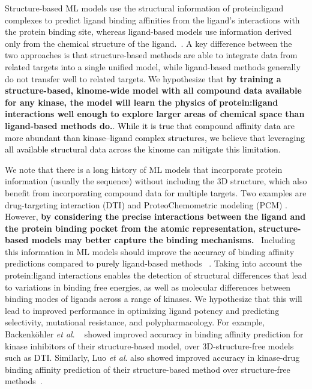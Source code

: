 \documentclass[9pt,lessons]{livecoms}
\newcommand{\revision}[1]{\textcolor{black}{#1}}
\begin{document}
Structure-based ML models use the structural information of protein:ligand complexes to predict ligand binding affinities from the ligand's interactions with the protein binding site, whereas ligand-based models use information derived only from the chemical structure of the ligand.~\cite{sliwoski2014computational, sadybekov2023computational, backenkohler2023guided}. A key difference between the two approaches is that structure-based methods are able to integrate data from related targets into a single unified model, while ligand-based methods generally do not transfer well to related targets. We hypothesize that \textbf{by training a structure-based, kinome-wide model with all compound data available for any kinase, the model will learn the physics of protein:ligand interactions well enough to explore larger areas of chemical space than ligand-based methods do.}\cite{sliwoski2014computational, sadybekov2023computational}. 
\revision{While it is true that compound affinity data are more abundant than kinase–ligand complex structures, we believe that leveraging all available structural data across the kinome can mitigate this limitation.}

We note that there is a long history of ML models that incorporate protein information (usually the sequence) without including the 3D structure, which also benefit from incorporating compound data for multiple targets. Two examples are drug-targeting interaction (DTI) and ProteoChemometric modeling (PCM) \cite{kimber2021deep, Backenkhler2023}.
However, \textbf{by considering the precise interactions between the ligand and the protein binding pocket from the atomic representation, structure-based models may better capture the binding mechanisms.}~\cite{sliwoski2014computational} Including this information in ML models should improve \revision{the accuracy of} binding affinity predictions compared to \revision{purely} ligand-based methods
~\cite{liu2023hybrid, schaller2023benchmarking}. Taking into account the protein:ligand interactions enables the detection of structural differences that lead to variations in binding free energies, as well as molecular differences between binding modes of ligands across a range of kinases. We hypothesize that this will lead to improved performance in optimizing ligand potency and predicting selectivity, mutational resistance, and polypharmacology. For example, Backenk\"ohler \textit{et al}. ~\cite{backenkohler2023guided} showed improved \revision{accuracy} in binding affinity prediction for kinase inhibitors of their structure-based model, over 3D-structure-free models such as DTI. Similarly, Luo \textit{et al}. also showed improved \revision{accuracy} in kinase-drug binding affinity prediction of their structure-based method over structure-free methods~\cite{luo2023calibrated}.
\end{document}
